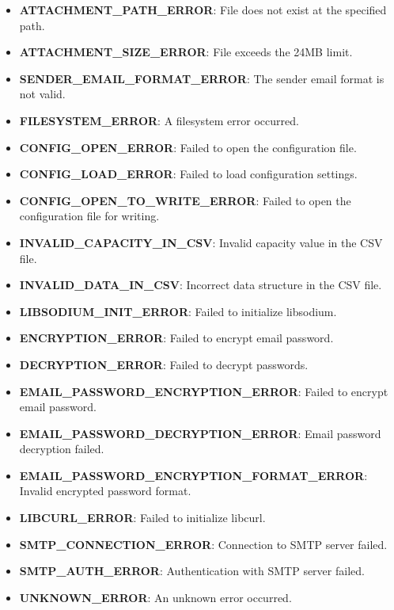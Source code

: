 \documentclass{article}
\begin{document}
\begin{itemize}
		\item \textbf{ATTACHMENT\_PATH\_ERROR}: File does not exist at the specified path.
		\item \textbf{ATTACHMENT\_SIZE\_ERROR}: File exceeds the 24MB limit.
		\item \textbf{SENDER\_EMAIL\_FORMAT\_ERROR}: The sender email format is not valid.
		\item \textbf{FILESYSTEM\_ERROR}: A filesystem error occurred.
		\item \textbf{CONFIG\_OPEN\_ERROR}: Failed to open the configuration file.
		\item \textbf{CONFIG\_LOAD\_ERROR}: Failed to load configuration settings.
		\item \textbf{CONFIG\_OPEN\_TO\_WRITE\_ERROR}: Failed to open the configuration file for writing.
		\item \textbf{INVALID\_CAPACITY\_IN\_CSV}: Invalid capacity value in the CSV file.
		\item \textbf{INVALID\_DATA\_IN\_CSV}: Incorrect data structure in the CSV file.
		\item \textbf{LIBSODIUM\_INIT\_ERROR}: Failed to initialize libsodium.
		\item \textbf{ENCRYPTION\_ERROR}: Failed to encrypt email password.
		\item \textbf{DECRYPTION\_ERROR}: Failed to decrypt passwords.
		\item \textbf{EMAIL\_PASSWORD\_ENCRYPTION\_ERROR}: Failed to encrypt email password.
		\item \textbf{EMAIL\_PASSWORD\_DECRYPTION\_ERROR}: Email password decryption failed.
		\item \textbf{EMAIL\_PASSWORD\_ENCRYPTION\_FORMAT\_ERROR}: Invalid encrypted password format.
		\item \textbf{LIBCURL\_ERROR}: Failed to initialize libcurl.
		\item \textbf{SMTP\_CONNECTION\_ERROR}: Connection to SMTP server failed.
		\item \textbf{SMTP\_AUTH\_ERROR}: Authentication with SMTP server failed.
		\item \textbf{UNKNOWN\_ERROR}: An unknown error occurred.
	\end{itemize}
	
\end{document}
